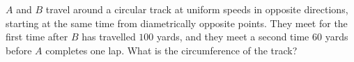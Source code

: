 $A$ and $B$ travel around a circular track at uniform speeds in opposite directions, starting at the same time from diametrically opposite points. They meet for the first time after $B$ has travelled $100$ yards, and they meet a second time $60$ yards before $A$ completes one lap. What is the circumference of the track?
